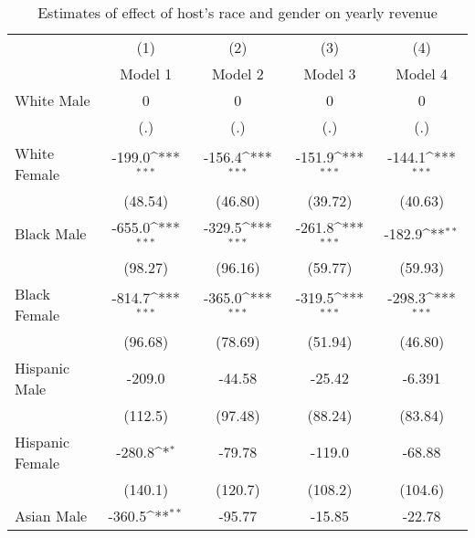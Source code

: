 {
\def\sym#1{\ifmmode^{#1}\else\(^{#1}\)\fi}
\begin{longtable}{l*{4}{c}}
\caption{Estimates of effect of host's race and gender on yearly revenue}\\
\hline\hline\endfirsthead\hline\endhead\hline\endfoot\endlastfoot
                    &\multicolumn{1}{c}{(1)}&\multicolumn{1}{c}{(2)}&\multicolumn{1}{c}{(3)}&\multicolumn{1}{c}{(4)}\\
                    &\multicolumn{1}{c}{Model 1}&\multicolumn{1}{c}{Model 2}&\multicolumn{1}{c}{Model 3}&\multicolumn{1}{c}{Model 4}\\
\hline
White Male          &           0         &           0         &           0         &           0         \\
                    &         (.)         &         (.)         &         (.)         &         (.)         \\
[1em]
White Female        &      -199.0\sym{***}&      -156.4\sym{***}&      -151.9\sym{***}&      -144.1\sym{***}\\
                    &     (48.54)         &     (46.80)         &     (39.72)         &     (40.63)         \\
[1em]
Black Male          &      -655.0\sym{***}&      -329.5\sym{***}&      -261.8\sym{***}&      -182.9\sym{**} \\
                    &     (98.27)         &     (96.16)         &     (59.77)         &     (59.93)         \\
[1em]
Black Female        &      -814.7\sym{***}&      -365.0\sym{***}&      -319.5\sym{***}&      -298.3\sym{***}\\
                    &     (96.68)         &     (78.69)         &     (51.94)         &     (46.80)         \\
[1em]
Hispanic Male       &      -209.0         &      -44.58         &      -25.42         &      -6.391         \\
                    &     (112.5)         &     (97.48)         &     (88.24)         &     (83.84)         \\
[1em]
Hispanic Female     &      -280.8\sym{*}  &      -79.78         &      -119.0         &      -68.88         \\
                    &     (140.1)         &     (120.7)         &     (108.2)         &     (104.6)         \\
[1em]
Asian Male          &      -360.5\sym{**} &      -95.77         &      -15.85         &      -22.78         \\

\end{longtable}}
